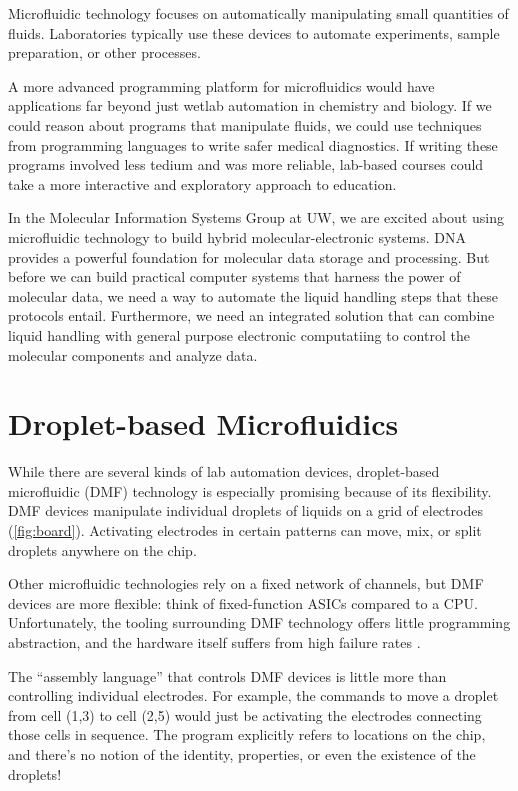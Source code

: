 \documentclass[
  10pt,
  a4paper,
  twocolumn,
]{article}
\begin{document}
Microfluidic technology focuses on automatically manipulating small quantities of fluids.
Laboratories typically use these devices to automate experiments, sample preparation, or other processes.

A more advanced programming platform for microfluidics would have applications far beyond just wetlab automation in chemistry and biology.
If we could reason about programs that manipulate fluids, we could use techniques from programming languages to write safer medical diagnostics.
If writing these programs involved less tedium and was more reliable, lab-based courses could take a more interactive and exploratory approach to education.

In the Molecular Information Systems Group at UW, we are excited about using microfluidic technology to build hybrid molecular-electronic systems.
DNA provides a powerful foundation for molecular data storage \cite{bornholt2016} and  processing.
But before we can build practical computer systems that harness the power of molecular data, we need a way to automate the liquid handling steps that these protocols entail.
Furthermore, we need an integrated solution that can combine liquid handling with general purpose electronic computatiing to control the molecular components and analyze data.

\section*{Droplet-based Microfluidics}

While there are several kinds of lab automation devices,
droplet-based microfluidic (DMF) technology is especially promising because of its flexibility.
DMF devices manipulate individual droplets of liquids on a grid of electrodes (\autoref{fig:board}).
Activating electrodes in certain patterns can move, mix, or split droplets anywhere on the chip.

Other microfluidic technologies rely on a fixed network of channels, but DMF
devices are more flexible: think of fixed-function ASICs compared to a CPU.
Unfortunately, the tooling surrounding DMF technology offers little programming abstraction,
and the hardware itself suffers from high failure rates \cite{dmf-review}.

The ``assembly language'' that controls DMF devices is little more than controlling individual electrodes.
For example, the commands to move a droplet from cell (1,3) to cell (2,5) would just be activating the electrodes connecting those cells in sequence.
The program explicitly refers to locations on the chip, and there's no notion of the identity, properties, or even the existence of the droplets!
\end{document}
